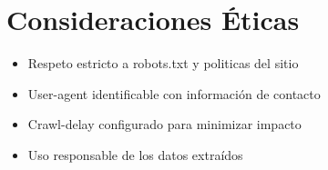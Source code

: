 \documentclass[a4paper,11pt]{article}
\begin{document}
\section{Consideraciones Éticas}
\begin{itemize}
    \item Respeto estricto a robots.txt y politicas del sitio
    \item User-agent identificable con información de contacto
    \item Crawl-delay configurado para minimizar impacto
    \item Uso responsable de los datos extraídos
\end{itemize}
\end{document}
